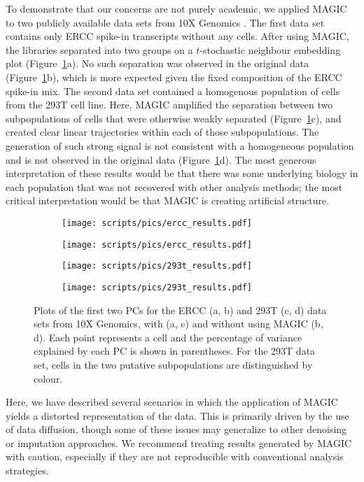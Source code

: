 \documentclass[10pt,letterpaper]{article}
\begin{document}
To demonstrate that our concerns are not purely academic, we applied MAGIC to two publicly available data sets from 10X Genomics \cite{zheng2017massively}.
The first data set contains only ERCC spike-in transcripts without any cells.
After using MAGIC, the libraries separated into two groups on a $t$-stochastic neighbour embedding \cite{van2008visualizing} plot (Figure~\ref{fig:realdata}a).
No such separation was observed in the original data (Figure~\ref{fig:realdata}b), which is more expected given the fixed composition of the ERCC spike-in mix.
The second data set contained a homogenous population of cells from the 293T cell line.
Here, MAGIC amplified the separation between two subpopulations of cells that were otherwise weakly separated (Figure~\ref{fig:realdata}c),
and created clear linear trajectories within each of those subpopulations.
The generation of such strong signal is not consistent with a homogeneous population and is not observed in the original data (Figure~\ref{fig:realdata}d).
The most generous interpretation of these results would be that there was some underlying biology in each population that was not recovered with other analysis methods;
the most critical interpretation would be that MAGIC is creating artificial structure.

\begin{figure}[btp]
\centering
\begin{subfigure}[b]{0.49\textwidth}
    \texttt{[image: scripts/pics/ercc\_results.pdf]}
    \caption{}
\end{subfigure}
\begin{subfigure}[b]{0.49\textwidth}
    \texttt{[image: scripts/pics/ercc\_results.pdf]}
    \caption{}
\end{subfigure}
\begin{subfigure}[b]{0.49\textwidth}
    \texttt{[image: scripts/pics/293t\_results.pdf]}
    \caption{}
\end{subfigure}
\begin{subfigure}[b]{0.49\textwidth}
    \texttt{[image: scripts/pics/293t\_results.pdf]}
    \caption{}
\end{subfigure}
\caption{Plots of the first two PCs for the ERCC (a, b) and 293T (c, d) data sets from 10X Genomics, with (a, c) and without using MAGIC (b, d).
Each point represents a cell and the percentage of variance explained by each PC is shown in parentheses.
For the 293T data set, cells in the two putative subpopulations are distinguished by colour.}
\label{fig:realdata}
\end{figure}

Here, we have described several scenarios in which the application of MAGIC yields a distorted representation of the data.
This is primarily driven by the use of data diffusion, though some of these issues may generalize to other denoising or imputation approaches.
We recommend treating results generated by MAGIC with caution, especially if they are not reproducible with conventional analysis strategies.



\end{document}
